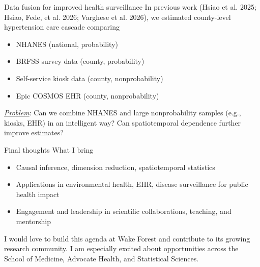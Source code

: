 \documentclass[
  ignorenonframetext,
  aspectratio=169,
  11pt]{beamer}
\providecommand{\tightlist}{%
  \setlength{\itemsep}{0pt}\setlength{\parskip}{0pt}}
\begin{document}
\begin{frame}{Data fusion for improved health surveillance}
\protect{}\label{data-fusion-for-improved-health-surveillance}
In previous work {\color{emoryblue}(Hsiao et al. 2025; Hsiao, Fede, et
al. 2026; Varghese et al. 2026)}, we estimated county-level hypertension
care cascade comparing

\begin{itemize}
\tightlist
\item
  NHANES (national, probability)
\item
  BRFSS survey data (county, probability)
\item
  Self-service kiosk data (county, nonprobability)
\item
  Epic COSMOS EHR (county, nonprobability)
\end{itemize}

\underline{\textit{Problem}}: Can we combine NHANES and large
nonprobability samples (e.g., kiosks, EHR) in an intelligent way? Can
spatiotemporal dependence further improve estimates?
\end{frame}

\begin{frame}{Final thoughts}
\protect{}\label{final-thoughts}
What I bring

\begin{itemize}
\tightlist
\item
  Causal inference, dimension reduction, spatiotemporal statistics
\item
  Applications in environmental health, EHR, disease surveillance for
  public health impact
\item
  Engagement and leadership in scientific collaborations, teaching, and
  mentorship
\end{itemize}

\vspace{0.15cm}

I would love to build this agenda at Wake Forest and contribute to its
growing research community. I am especially excited about opportunities
across the School of Medicine, Advocate Health, and Statistical
Sciences.
\end{frame}
\end{document}
